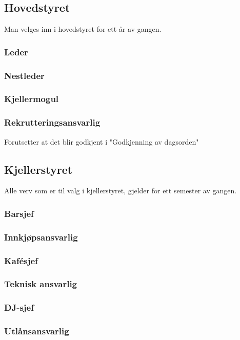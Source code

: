 \documentclass[10pt,norsk,a4paper]{article}
\begin{document}
\begin{minipage}[t]{9cm}
\subsection{Hovedstyret}
Man velges inn i hovedstyret for ett år av gangen.
\subsubsection{Leder}

\subsubsection{Nestleder}

\subsubsection{Kjellermogul}

\subsubsection{Rekrutteringsansvarlig} 
Forutsetter at det blir godkjent i "Godkjenning av dagsorden"

\end{minipage}
\begin{minipage}[t]{9cm}
\subsection{Kjellerstyret}
Alle verv som er til valg i kjellerstyret, gjelder for ett semester av gangen.

\subsubsection{Barsjef}

\subsubsection{Innkjøpsansvarlig}

\subsubsection{Kafésjef}

\subsubsection{Teknisk ansvarlig}

\subsubsection{DJ-sjef}

\subsubsection{Utlånsansvarlig}

\end{minipage}
\end{document}
